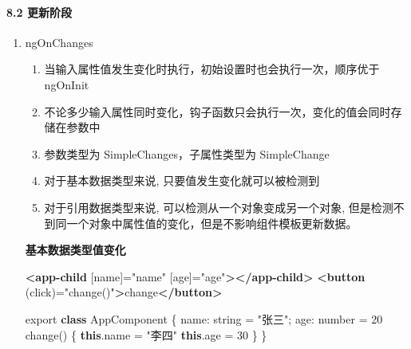 \documentclass[
]{article}
\newenvironment{Shaded}{}{}
\newcommand{\AttributeTok}[1]{\textcolor[rgb]{0.49,0.56,0.16}{#1}}
\newcommand{\DataTypeTok}[1]{\textcolor[rgb]{0.56,0.13,0.00}{#1}}
\newcommand{\DecValTok}[1]{\textcolor[rgb]{0.25,0.63,0.44}{#1}}
\newcommand{\FunctionTok}[1]{\textcolor[rgb]{0.02,0.16,0.49}{#1}}
\newcommand{\ImportTok}[1]{#1}
\newcommand{\KeywordTok}[1]{\textcolor[rgb]{0.00,0.44,0.13}{\textbf{#1}}}
\newcommand{\NormalTok}[1]{#1}
\newcommand{\OperatorTok}[1]{\textcolor[rgb]{0.40,0.40,0.40}{#1}}
\newcommand{\OtherTok}[1]{\textcolor[rgb]{0.00,0.44,0.13}{#1}}
\newcommand{\StringTok}[1]{\textcolor[rgb]{0.25,0.44,0.63}{#1}}
\begin{document}
\hypertarget{82-ux66f4ux65b0ux9636ux6bb5}{%
\paragraph{8.2 更新阶段}\label{82-ux66f4ux65b0ux9636ux6bb5}}

\begin{enumerate}
\def\labelenumi{\arabic{enumi}.}
\item
  ngOnChanges

  \begin{enumerate}
  \def\labelenumii{\arabic{enumii}.}
  \item
    当输入属性值发生变化时执行，初始设置时也会执行一次，顺序优于
    ngOnInit
  \item
    不论多少输入属性同时变化，钩子函数只会执行一次，变化的值会同时存储在参数中
  \item
    参数类型为 SimpleChanges，子属性类型为 SimpleChange
  \item
    对于基本数据类型来说, 只要值发生变化就可以被检测到
  \item
    对于引用数据类型来说, 可以检测从一个对象变成另一个对象,
    但是检测不到同一个对象中属性值的变化，但是不影响组件模板更新数据。
  \end{enumerate}

  \textbf{基本数据类型值变化}

\begin{Shaded}
\begin{Highlighting}[]
\KeywordTok{\textless{}app{-}child}\OtherTok{ [name]=}\StringTok{"name"}\OtherTok{ [age]=}\StringTok{"age"}\KeywordTok{\textgreater{}\textless{}/app{-}child\textgreater{}}
\KeywordTok{\textless{}button}\OtherTok{ (click)=}\StringTok{"change()"}\KeywordTok{\textgreater{}}\NormalTok{change}\KeywordTok{\textless{}/button\textgreater{}}
\end{Highlighting}
\end{Shaded}

\begin{Shaded}
\begin{Highlighting}[]
\ImportTok{export} \KeywordTok{class}\NormalTok{ AppComponent \{}
  \DataTypeTok{name}\OperatorTok{:}\NormalTok{ string }\OperatorTok{=} \StringTok{"张三"}\OperatorTok{;}
	\DataTypeTok{age}\OperatorTok{:}\NormalTok{ number }\OperatorTok{=} \DecValTok{20}
  \FunctionTok{change}\NormalTok{() \{}
    \KeywordTok{this}\OperatorTok{.}\AttributeTok{name} \OperatorTok{=} \StringTok{"李四"}
    \KeywordTok{this}\OperatorTok{.}\AttributeTok{age} \OperatorTok{=} \DecValTok{30}
\NormalTok{  \}}
\NormalTok{\}}
\end{Highlighting}
\end{Shaded}


\end{enumerate}
\end{document}
